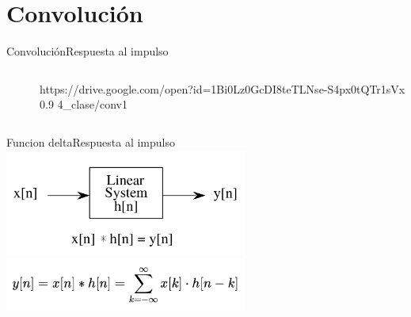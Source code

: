 \section{Convolución}
\begin{frame}{Convolución}{Respuesta al impulso}
   \begin{columns}[c]
      \hspace{5pt}
      \begin{column}{.3\textwidth}
         
      \end{column}
      \hspace{2pt}
      \vrule
      \hspace{2pt}
      \begin{column}{.3\textwidth}
         
      \end{column}
      \hspace{2pt}
      \vrule
      \hspace{2pt}
      \begin{column}{.38\textwidth}
         {https://drive.google.com/open?id=1Bi0Lz0GcDI8teTLNse-S4px0tQTr1sVx}
         {0.9}
         {4_clase/conv1}
      \end{column}
      \hspace{2pt}
   \end{columns}
   \vfill
\end{frame}
\begin{frame}{Funcion delta}{Respuesta al impulso}
   \centering\includegraphics[width=0.6\textwidth]{4_clase/entrada_conv_h}\\
   \centering\includegraphics[width=0.6\textwidth]{4_clase/convolucion_eq}
   \vfill
\end{frame}

